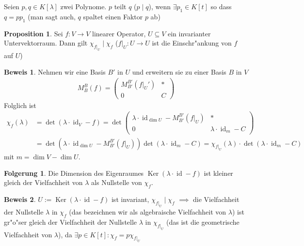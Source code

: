 \documentclass[oneside,fontsize=11pt,paper=a4,BCOR=0mm,DIV=12,automark,headsepline]{scrbook}
\DeclareMathOperator{\mKer}{Ker}
\DeclareMathOperator{\mId}{id}
\theoremstyle{remark}
\theoremstyle{definition}
\newtheorem{folgerung}{Folgerung}
\newtheorem*{proposition}{Proposition}
\theoremstyle{definition}
\newtheorem*{prof}{Beweis}
\theoremstyle{remark}
\begin{document}
\begin{definition}{}{}
  Seien $p,q\in K[\lambda]$ zwei Polynome. $p$ teilt $q$ ($p\mid q$), wenn \(\exists p_1 \in K[t]\) so dass \(q = pp_1\)
  (man sagt auch, \(q\) spaltet einen Faktor \(p\) ab)
\end{definition}

\begin{proposition}
  Sei \(f: V\to V\) linearer Operator, $U\subseteq V$ ein invarianter Untervektorraum. Dann gilt \(\chi_{f|_U} \mid \chi_f\) (\(f|_U:U\to U\) ist die Einschr"ankung von \(f\) auf \(U\))
\end{proposition}
\begin{prof}
  Nehmen wir eine Basis $B'$ in $U$ und erweitern sie zu einer Basis $B$ in $V$
  \begin{align*}
    M^B_B(f) =
    \begin{pmatrix}
      M^{B'}_{B'}(f|_U') & * \\
      0 & C
    \end{pmatrix}
  \end{align*}
  Folglich ist
  \begin{align*}
    \chi_f(\lambda) &= \det(\lambda\cdot\mId_V - f) = \det
                      \begin{pmatrix}
                        \lambda\cdot\mId_{\dim U} - M^{B'}_{B'}(f|_U) & *\\
                        0 & \lambda\cdot\mId_m - C
                      \end{pmatrix}\\
                    &= \det(\lambda\cdot\mId_{\dim U} - M^{B'}_{B'}(f|_U))\det(\lambda\cdot\mId_m  - C) = \chi_{f|_U}(\lambda)\cdot\det(\lambda\cdot\mId_m - C)
  \end{align*}
  mit \(m = \dim V - \dim U\).
\end{prof}

\begin{folgerung}
  Die Dimension des Eigenraumes \(\mKer(\lambda\cdot\mId - f)\) ist kleiner gleich der Vielfachheit von \(\lambda\) als Nullstelle von \(\chi_f\).
\end{folgerung}

\begin{prof}
  \(U:= \mKer(\lambda\cdot\mId - f)\) ist invariant,
  \(\chi_{f|_U} \mid \chi_f\) \(\implies\) die Vielfachheit der Nullstelle \(\lambda\) in \(\chi_f\) (das bezeichnen wir als \glqq{}algebraische\grqq{} Vielfachheit von \(\lambda\)) ist gr"o"ser gleich der Vielfachheit der Nullstelle \(\lambda\) in \(\chi_{f|_U}\) (das ist die \glqq{}geometrische\grqq{} Vielfachheit von \(\lambda\)), da \(\exists p\in K[t]: \chi_f = p\chi_{f|_U}\)
\end{prof}
\end{document}
